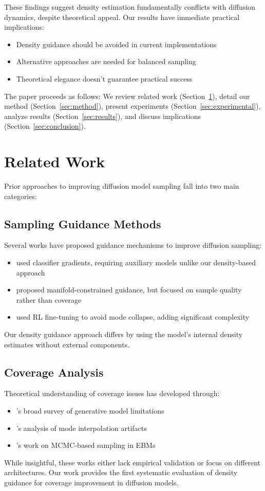 \documentclass{article} %
\begin{document}
These findings suggest density estimation fundamentally conflicts with diffusion dynamics, despite theoretical appeal. Our results have immediate practical implications:
\begin{itemize}
    \item Density guidance should be avoided in current implementations
    \item Alternative approaches are needed for balanced sampling
    \item Theoretical elegance doesn't guarantee practical success
\end{itemize}

The paper proceeds as follows: We review related work (Section~\ref{sec:related}), detail our method (Section~\ref{sec:method}), present experiments (Section~\ref{sec:experimental}), analyze results (Section~\ref{sec:results}), and discuss implications (Section~\ref{sec:conclusion}).

\section{Related Work}
\label{sec:related}

Prior approaches to improving diffusion model sampling fall into two main categories:

\subsection{Sampling Guidance Methods}
Several works have proposed guidance mechanisms to improve diffusion sampling:
\begin{itemize}
    \item \citet{pmlr-v37-sohl-dickstein15} used classifier gradients, requiring auxiliary models unlike our density-based approach
    \item \citet{Chung2024CFGMC} proposed manifold-constrained guidance, but focused on sample quality rather than coverage
    \item \citet{Barcel'o2024AvoidingMC} used RL fine-tuning to avoid mode collapse, adding significant complexity
\end{itemize}
Our density guidance approach differs by using the model's internal density estimates without external components.

\subsection{Coverage Analysis}
Theoretical understanding of coverage issues has developed through:
\begin{itemize}
    \item \citet{yang2023diffusion}'s broad survey of generative model limitations
    \item \citet{Aithal2024UnderstandingHI}'s analysis of mode interpolation artifacts
    \item \citet{Nijkamp2019OnTA}'s work on MCMC-based sampling in EBMs
\end{itemize}
While insightful, these works either lack empirical validation or focus on different architectures. Our work provides the first systematic evaluation of density guidance for coverage improvement in diffusion models.
\end{document}
